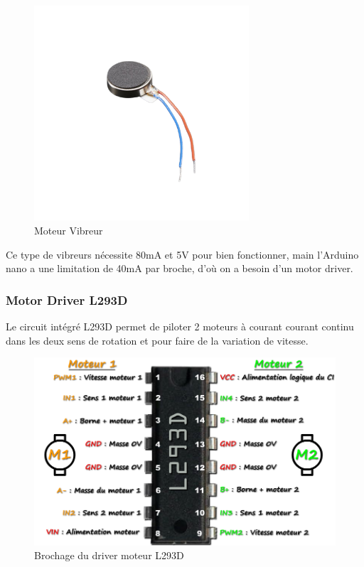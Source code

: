 \begin{figure}[!htbp]
    \centering
    \includegraphics[width=8cm]{assets/vibrator.png}
    \caption{Moteur Vibreur}
\end{figure}

\FloatBarrier

Ce type de vibreurs nécessite 80mA et 5V pour bien fonctionner, main l'Arduino nano a une limitation de 40mA par broche, d'où on a besoin d'un motor driver.

\subsubsection{Motor Driver L293D}
Le circuit intégré L293D permet de piloter 2 moteurs à courant courant continu dans les deux sens de rotation et pour faire de la variation de vitesse.

\begin{figure}[!htbp]
    \centering
    \includegraphics[width=14cm]{assets/L293D/pinout.png}
    \caption{Brochage du driver moteur L293D \cite{l293d-electrotoile}}
\end{figure}


